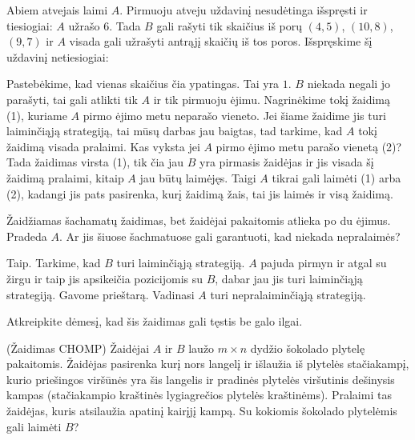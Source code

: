 \begin{sprendimas}
  Abiem atvejais laimi $A$. Pirmuoju atveju uždavinį nesudėtinga išspręsti
  ir tiesiogiai: $A$ užrašo $6$. Tada $B$ gali rašyti tik skaičius iš porų
  $(4,5)$, $(10,8)$, $(9,7)$ ir $A$ visada gali užrašyti antrąjį skaičių iš
  tos poros. Išspręskime šį uždavinį netiesiogiai:

  Pastebėkime, kad vienas skaičius čia ypatingas. Tai yra
  $1$. $B$ niekada negali jo parašyti, tai gali atlikti tik $A$ ir tik
  pirmuoju ėjimu. Nagrinėkime tokį žaidimą (1), kuriame $A$ pirmo ėjimo metu
  neparašo vieneto. Jei šiame žaidime jis turi laiminčiąją strategiją, tai
  mūsų darbas jau baigtas, tad tarkime, kad $A$ tokį žaidimą visada pralaimi.
  Kas vyksta jei $A$ pirmo ėjimo metu parašo vienetą (2)? Tada žaidimas virsta
  (1), tik čia jau $B$ yra pirmasis žaidėjas ir jis visada šį žaidimą
  pralaimi, kitaip $A$ jau būtų laimėjęs. Taigi $A$ tikrai gali laimėti (1)
  arba (2), kadangi jis pats pasirenka, kurį žaidimą žais, tai jis laimės ir
  visą žaidimą. 
\end{sprendimas}

\begin{pavnr}
  Žaidžiamas šachamatų žaidimas, bet žaidėjai pakaitomis atlieka po du
  ėjimus. Pradeda $A$. Ar jis šiuose šachmatuose gali
  garantuoti, kad niekada nepralaimės? 
\end{pavnr}

\begin{sprendimas}
  Taip. Tarkime, kad $B$ turi laiminčiąją strategiją.
  $A$ pajuda pirmyn ir atgal su žirgu ir taip jis apsikeičia pozicijomis su
  $B$, dabar jau jis turi laiminčiąją strategiją. Gavome prieštarą. Vadinasi
  $A$ turi nepralaiminčiąją strategiją. 
\end{sprendimas}

\begin{pastaba}
  Atkreipkite dėmesį, kad šis žaidimas gali tęstis be galo ilgai.
\end{pastaba}

\begin{pavnr}{(Žaidimas CHOMP)}
  Žaidėjai $A$ ir $B$ laužo $m\times n$ dydžio šokolado plytelę pakaitomis.
  Žaidėjas pasirenka kurį nors langelį ir išlaužia iš plytelės stačiakampį,
  kurio priešingos viršūnės yra šis langelis ir pradinės plytelės
  viršutinis dešinysis kampas (stačiakampio kraštinės lygiagrečios plytelės
  kraštinėms).  Pralaimi tas žaidėjas, kuris atsilaužia apatinį kairįjį
  kampą. Su kokiomis šokolado plytelėmis gali laimėti $B$?
  \label{CHOMP}
\end{pavnr}

